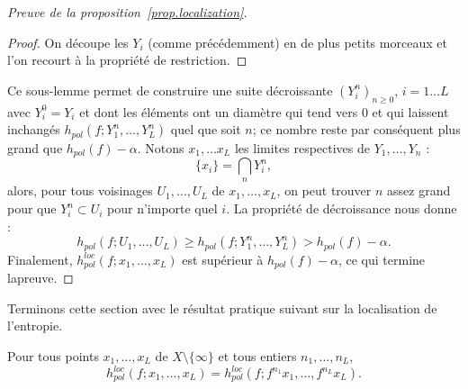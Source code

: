 \begin{proof}[Preuve de la proposition~\ref{prop.localization}]
\begin{proof}
On découpe les $Y_i$ (comme précédemment) en de plus petits morceaux et l'on recourt à la propriété de restriction.
\end{proof}

Ce sous-lemme permet de construire une suite décroissante $(Y_i^n)_{n \geq 0}$, $i=1 \dots L$ avec $Y_i^0 = Y_i$ et dont les éléments ont un diamètre qui tend vers $0$ et qui laissent inchangés $h_{pol}(f; Y_{1}^n, \dots, Y_{L}^n)$ quel que soit $n$; {ce nombre reste par conséquent plus grand que $h_{pol}(f)-\alpha$}. {Notons} $x_1, \dots x_L$ les limites respectives de $Y_1, \dots, Y_n$ :
\[
\{x_i\} = \bigcap_n Y_i^n,
\]
alors, pour tous voisinages $U_1, \dots, U_L$ de $x_1, \dots, x_L$, on peut trouver $n$ assez grand pour que $Y_i^n \subset U_i$ pour n'importe quel $i$. La propriété de décroissance nous donne :
\[
h_{pol}(f; U_{1}, \dots, U_{L}) \geq h_{pol}(f; Y_{1}^n, \dots, Y_{L}^n) > h_{pol}(f)-\alpha.
\]
Finalement, $h^{loc}_{pol}(f; x_{1}, \dots, x_{L})$ est supérieur à $h_{pol}(f)-\alpha$, {ce qui termine la\linebreak preuve}.
\end{proof}

Terminons cette section avec le résultat pratique suivant sur la localisation de l'entropie.

\begin{lemm}\label{lemm.iterates}
Pour tous points $x_1, \dots, x_L$ de $X \setminus\{\infty\}$ et tous entiers $n_{1}, \dots, n_{L}$,
\[
h^{loc}_{pol}(f;x_{1}, \dots, x_{L}) = h^{loc}_{pol}(f;f^{n_{1}}x_{1}, \dots, f^{n_{L}}x_{L}).
\]
\end{lemm}

